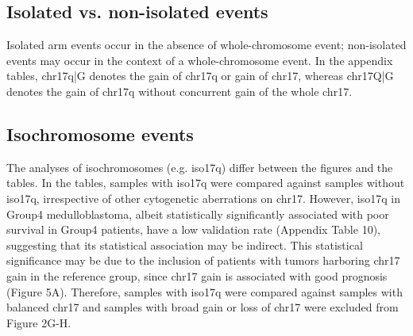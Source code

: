 \subsection{Isolated vs. non-isolated events}

Isolated arm events occur in the absence of whole-chromosome event; non-isolated events may occur in the context of a whole-chromosome event. In the appendix tables, chr17q|G denotes the gain of chr17q or gain of chr17, whereas chr17Q|G denotes the gain of chr17q without concurrent gain of the whole chr17.

\subsection{Isochromosome events}

The analyses of isochromosomes (e.g. iso17q) differ between the figures and the tables. In the tables, samples with iso17q were compared against samples without iso17q, irrespective of other cytogenetic aberrations on chr17. However, iso17q in Group4 medulloblastoma, albeit statistically significantly associated with poor survival in Group4 patients, have a low validation rate (Appendix Table 10), suggesting that its statistical association may be indirect. This statistical significance may be due to the inclusion of patients with tumors harboring chr17 gain in the reference group, since chr17 gain is associated with good prognosis (Figure 5A). Therefore, samples with iso17q were compared against samples with balanced chr17 and samples with broad gain or loss of chr17 were excluded from Figure 2G-H.
